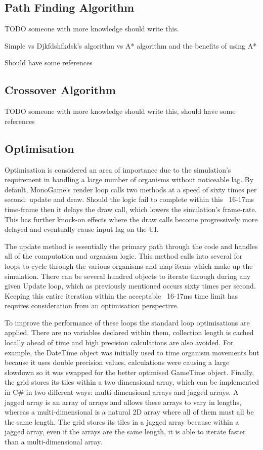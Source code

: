 \documentclass{ueacmpstyle}
\begin{document}
\subsection{Path Finding Algorithm}
TODO someone with more knowledge should write this.

Simple vs Djkfdshfkdsk's algorithm vs A* algorithm and the benefits of using A*

Should have some references
\subsection{Crossover Algorithm}
TODO someone with more knowledge should write this, should have some references
\subsection{Optimisation}\label{optim}
Optimisation is considered an area of importance due to the simulation's requirement in handling a large number of organisms without noticeable lag. By default, MonoGame's render loop calls two methods at a speed of sixty times per second: update and draw. Should the logic fail to complete within this ~16-17ms time-frame then it delays the draw call, which lowers the simulation's frame-rate. This has further knock-on effects where the draw calls become progressively more delayed and eventually cause input lag on the UI.

The update method is essentially the primary path through the code and handles all of the computation and organism logic. This method calls into several for loops to cycle through the various organisms and map items which make up the simulation. There can be several hundred objects to iterate through during any given Update loop, which as previously mentioned occurs sixty times per second. Keeping this entire iteration within the acceptable ~16-17ms time limit has requires consideration from an optimisation perspective.

To improve the performance of these loops the standard loop optimisations are applied. There are no variables declared within them, collection length is cached locally ahead of time and high precision calculations are also avoided. For example, the DateTime object was initially used to time organism movements but because it uses double precision values, calculations were causing a large slowdown so it was swapped for the better optimised GameTime object. Finally, the grid stores its tiles within a two dimensional array, which can be implemented in C\# in two different ways: multi-dimensional arrays and jagged arrays. A jagged array is an array of arrays and allows these arrays to vary in lengths, whereas a multi-dimensional is a natural 2D array where all of them must all be the same length. The grid stores its tiles in a jagged array because within a jagged array, even if the arrays are the same length, it is able to iterate faster than a multi-dimensional array.
\end{document}
